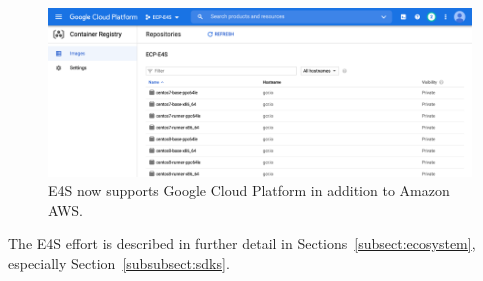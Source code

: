 \begin{figure}
	\centering
	\includegraphics[width=0.9\linewidth]{E4S-GCP}
	\caption{E4S now supports Google Cloud Platform in addition to Amazon AWS.}
	\label{fig:e4s-gcp-image}
\end{figure}

The E4S effort is described in further detail in Sections~\ref{subsect:ecosystem}, especially Section~\ref{subsubsect:sdks}.

